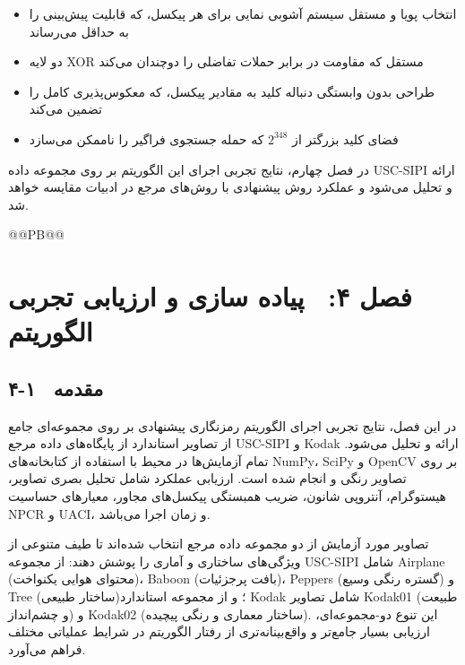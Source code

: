 \begin{itemize}
    \item انتخاب پویا و مستقل سیستم آشوبی نمایی برای هر پیکسل، که قابلیت پیش‌بینی را به حداقل می‌رساند
\end{itemize}

\begin{itemize}
    \item دو لایه ‎XOR‎ مستقل که مقاومت در برابر حملات تفاضلی را دوچندان می‌کند
\end{itemize}

\begin{itemize}
    \item طراحی بدون وابستگی دنباله کلید به مقادیر پیکسل، که معکوس‌پذیری کامل را تضمین می‌کند
\end{itemize}

\begin{itemize}
    \item فضای کلید بزرگتر از $2^{348}$ که حمله جستجوی فراگیر را ناممکن می‌سازد
\end{itemize}

در فصل چهارم، نتایج تجربی اجرای این الگوریتم بر روی مجموعه داده ‎USC-SIPI‎ ارائه و تحلیل می‌شود و عملکرد روش پیشنهادی با روش‌های مرجع در ادبیات مقایسه خواهد شد.


@@PB@@







\chapter{فصل ۴:  پیاده سازی و ارزیابی تجربی الگوریتم}
\section{۴-۱  مقدمه}

در این فصل، نتایج تجربی اجرای الگوریتم رمزنگاری پیشنهادی بر روی مجموعه‌ای جامع از تصاویر استاندارد از پایگاه‌های داده مرجع ‎USC-SIPI‎ و ‎Kodak‎ ارائه و تحلیل می‌شود. تمام آزمایش‌ها در محیط \pyver{} با استفاده از کتابخانه‌های ‎NumPy‎، ‎SciPy‎ و ‎OpenCV‎ بر روی تصاویر رنگی  و  انجام شده است. ارزیابی عملکرد شامل تحلیل بصری تصاویر، هیستوگرام، آنتروپی شانون، ضریب همبستگی پیکسل‌های مجاور، معیارهای حساسیت ‎NPCR‎ و ‎UACI‎، و زمان اجرا می‌باشد.

تصاویر مورد آزمایش از دو مجموعه داده مرجع انتخاب شده‌اند تا طیف متنوعی از ویژگی‌های ساختاری و آماری را پوشش دهند: از مجموعه ‎USC-SIPI‎ شامل ‎Airplane‎ (محتوای هوایی یکنواخت)، ‎Baboon‎ (بافت پرجزئیات)، ‎Peppers‎ (گستره رنگی وسیع) و ‎Tree‎ (ساختار طبیعی)؛ و از مجموعه استاندارد ‎Kodak‎ شامل تصاویر ‎Kodak01‎ (طبیعت و چشم‌انداز) و ‎Kodak02‎ (ساختار معماری و رنگی پیچیده). این تنوع دو-مجموعه‌ای، ارزیابی بسیار جامع‌تر و واقع‌بینانه‌تری از رفتار الگوریتم در شرایط عملیاتی مختلف فراهم می‌آورد.

